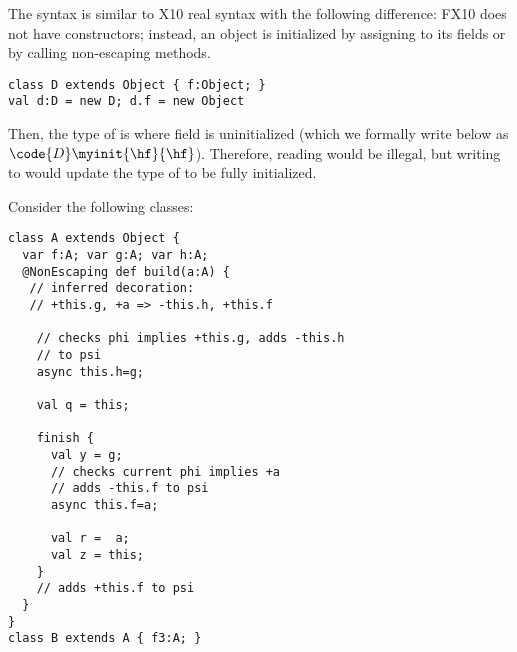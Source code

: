 The syntax is similar to X10 real syntax with the following difference:
FX10 does not have constructors; instead, an object is initialized by assigning to its fields or
    by calling
    non-escaping methods.


\begin{lstlisting}
class D extends Object { f:Object; }
val d:D = new D; d.f = new Object
\end{lstlisting}
Then, the type of  is  where field  is uninitialized
    (which we formally write below as $\code{D}\myinit{\hf}{\hf}$).
Therefore, reading  would be illegal, but writing to  would update the type of 
    to be fully initialized.

Consider the following classes:
\begin{lstlisting}
class A extends Object {
  var f:A; var g:A; var h:A;
  @NonEscaping def build(a:A) { 
   // inferred decoration: 
   // +this.g, +a => -this.h, +this.f

    // checks phi implies +this.g, adds -this.h 
    // to psi
    async this.h=g; 

    val q = this;

    finish {
      val y = g;
      // checks current phi implies +a
      // adds -this.f to psi
      async this.f=a; 

      val r =  a;
      val z = this;
    }
    // adds +this.f to psi
  }
}
class B extends A { f3:A; }
\end{lstlisting}



